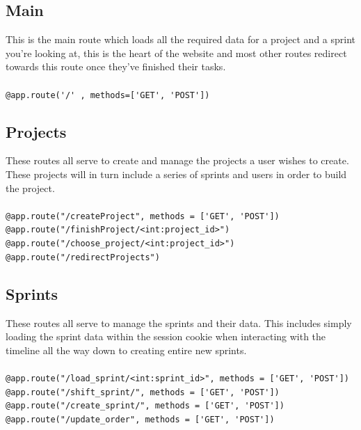 \documentclass{article}
\begin{document}
\subsection{Main}

\noindent This is the main route which loads all the required data for a project and a sprint 
you're looking at, this is the heart of the website and most other routes redirect towards this 
route once they've finished their tasks.\\\\
\verb|@app.route('/' , methods=['GET', 'POST'])|

\newpage

\subsection{Projects}

\noindent These routes all serve to create and manage the projects a user wishes to create. These 
projects will in turn include a series of sprints and users in order to build the project.\\\\
\verb|@app.route("/createProject", methods = ['GET', 'POST'])|\\
\verb|@app.route("/finishProject/<int:project_id>")|\\
\verb|@app.route("/choose_project/<int:project_id>")|\\
\verb|@app.route("/redirectProjects")|\\

\subsection{Sprints}
\noindent These routes all serve to manage the sprints and their data. This includes simply loading 
the sprint data within the session cookie when interacting with the timeline all the way down to 
creating entire new sprints.\\\\
\verb|@app.route("/load_sprint/<int:sprint_id>", methods = ['GET', 'POST'])|\\
\verb|@app.route("/shift_sprint/", methods = ['GET', 'POST'])|\\
\verb|@app.route("/create_sprint/", methods = ['GET', 'POST'])|\\
\verb|@app.route("/update_order", methods = ['GET', 'POST'])|\\
\end{document}
